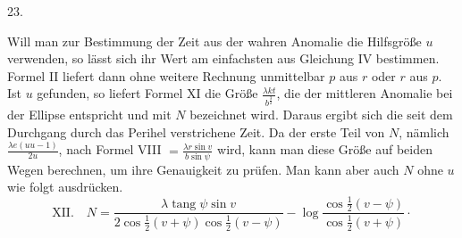 \par{}
\begin{center}
23.
\end{center}
Will man zur Bestimmung der Zeit aus der wahren Anomalie die Hilfsgröße $u$ verwenden, so lässt sich ihr Wert am einfachsten aus Gleichung IV bestimmen. Formel II liefert dann ohne weitere Rechnung unmittelbar $p$ aus $r$ oder $r$ aus $p$. Ist $u$ gefunden, so liefert Formel XI die Größe $\frac{\lambda k t}{b^{\frac{3}{2}}}$, die der mittleren Anomalie bei der Ellipse entspricht und mit $N$ bezeichnet wird. Daraus ergibt sich die seit dem Durchgang durch das Perihel verstrichene Zeit. Da der erste Teil von $N$, nämlich $\frac{\lambda e(u u-1)}{2u}$, nach Formel VIII $=\frac{\lambda r\sin v}{b\sin\psi}$ wird, kann man diese Größe auf beiden Wegen berechnen, um ihre Genauigkeit zu prüfen. Man kann aber auch $N$ ohne $u$ wie folgt ausdrücken.
\[
\mathrm{XII.}\quad N=\frac{\lambda\operatorname{tang}\psi\sin v}{2\cos\frac{1}{2}(v+\psi)\cos\frac{1}{2}(v-\psi)}-\log\frac{\cos\frac{1}{2}(v-\psi)}{\cos\frac{1}{2}(v+\psi)}\cdot
\]

